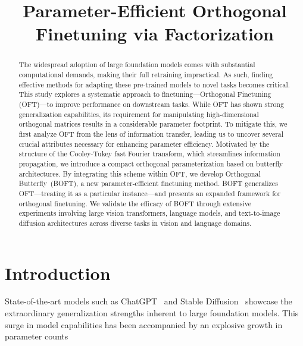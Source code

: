 \title{Parameter-Efficient Orthogonal Finetuning via Factorization}

\begin{abstract}
The widespread adoption of large foundation models comes with substantial computational demands, making their full retraining impractical. As such, finding effective methods for adapting these pre-trained models to novel tasks becomes critical. This study explores a systematic approach to finetuning—Orthogonal Finetuning (OFT)—to improve performance on downstream tasks. While OFT has shown strong generalization capabilities, its requirement for manipulating high-dimensional orthogonal matrices results in a considerable parameter footprint. To mitigate this, we first analyze OFT from the lens of information transfer, leading us to uncover several crucial attributes necessary for enhancing parameter efficiency. Motivated by the structure of the Cooley-Tukey fast Fourier transform, which streamlines information propagation, we introduce a compact orthogonal parameterization based on butterfly architectures. By integrating this scheme within OFT, we develop Orthogonal Butterfly~(BOFT), a new parameter-efficient finetuning method. BOFT generalizes OFT—treating it as a particular instance—and presents an expanded framework for orthogonal finetuning. We validate the efficacy of BOFT through extensive experiments involving large vision transformers, language models, and text-to-image diffusion architectures across diverse tasks in vision and language domains.
\end{abstract}

\section{Introduction}

State-of-the-art models such as ChatGPT~\cite{brown2020language,chen2021evaluating} and Stable Diffusion~\cite{rombach2022high} showcase the extraordinary generalization strengths inherent to large foundation models. This surge in model capabilities has been accompanied by an explosive growth in parameter counts

